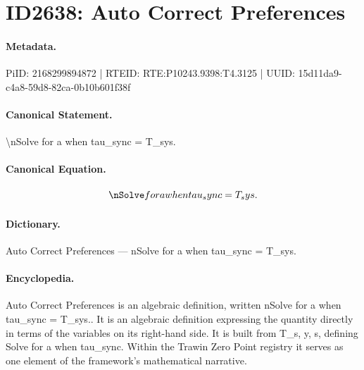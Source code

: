 \section*{ID2638: Auto Correct Preferences}
\paragraph{Metadata.}
PiID: 2168299894872 | RTEID: RTE:P10243.9398:T4.3125 | UUID: 15d11da9-c4a8-59d8-82ca-0b10b601f38f

\paragraph{Canonical Statement.}
\textbackslash{}nSolve for a when tau\_sync = T\_sys.

\paragraph{Canonical Equation.}
\[
\nSolve for a when tau_sync = T_sys.
\]

\paragraph{Dictionary.}
Auto Correct Preferences — nSolve for a when tau\_sync = T\_sys.

\paragraph{Encyclopedia.}
Auto Correct Preferences is an algebraic definition, written nSolve for a when tau\_sync = T\_sys.. It is an algebraic definition expressing the quantity directly in terms of the variables on its right-hand side. It is built from T\_s, y, s, defining Solve for a when tau\_sync. Within the Trawin Zero Point registry it serves as one element of the framework's mathematical narrative.
